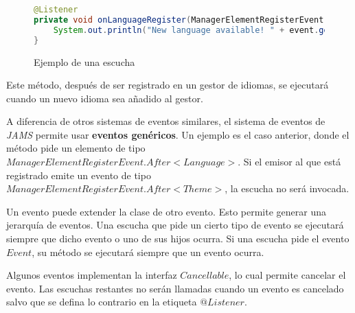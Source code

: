 \begin{figure}[h]
    \centering
    \begin{lstlisting}[language=Java,style=java,frame=single,label={lst:listeners}]
@Listener
private void onLanguageRegister(ManagerElementRegisterEvent.After<Language> event) {
    System.out.println("New language available! " + event.getElement().getName());
}
    \end{lstlisting}
    \caption{Ejemplo de una escucha}
    \label{fig:listener}
\end{figure}


\noindent Este método, después de ser registrado en un gestor de idiomas,
se ejecutará cuando un nuevo idioma sea añadido al gestor.

\noindent A diferencia de otros sistemas de eventos similares,
el sistema de eventos de \textit{JAMS} permite usar \textbf{eventos genéricos}.
Un ejemplo es el caso anterior, donde el método pide un elemento de tipo
$ManagerElementRegisterEvent.After<Language>$.
Si el emisor al que está registrado emite un evento de tipo
$ManagerElementRegisterEvent.After<Theme>$, la escucha no será invocada.

\noindent Un evento puede extender la clase de otro evento.
Esto permite generar una jerarquía de eventos.
Una escucha que pide un cierto tipo de evento se ejecutará siempre que dicho evento o uno de sus hijos ocurra.
Si una escucha pide el evento $Event$, su método se ejecutará siempre que un evento ocurra.

\noindent Algunos eventos implementan la interfaz $Cancellable$, lo cual permite cancelar el evento.
Las escuchas restantes no serán llamadas cuando un evento es cancelado salvo que se defina lo contrario
en la etiqueta $@Listener$.